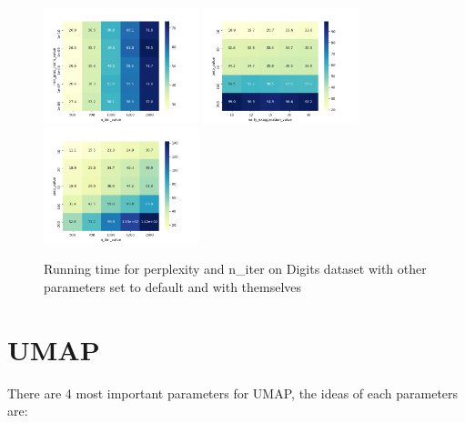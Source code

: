 \begin{figure}[H]
\centering  %
{
\label{Fig.sub.1}
\includegraphics[width=4.5cm,height=4.5cm\textwidth]{images/t-sne/Digit_elapsed_time_min_grad_norm_value_n_iter_value_heatmap.png}}
{
\label{Fig.sub.2}
\includegraphics[width=4.5cm,height=4.5cm\textwidth]{images/t-sne/Digit_elapsed_time_perp_value_early_exaggeration_value_heatmap.png}}
{
\label{Fig.sub.3}
\includegraphics[width=4.5cm,height=4.5cm\textwidth]{images/t-sne/Digit_elapsed_time_perp_value_n_iter_value_heatmap.png}}
\centering
\caption{Running time for perplexity and n\_iter on Digits dataset with other parameters set to default and with themselves }
\end{figure}

\section{UMAP}
There are 4 most important parameters for UMAP, the ideas of each parameters are:

